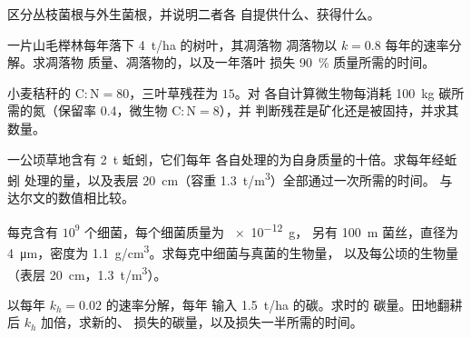 \begin{exercise}[$\star$]\label{exo:b2:living-soil:4}
区分丛枝菌根与外生菌根，并说明二者各
自提供什么、获得什么。
\end{exercise}

\begin{exercise}[$\star\star$]\label{exo:b2:living-soil:5}
一片山毛榉林每年落下 \qty{4}{t/ha} 的树叶，其凋落物
凋落物以 $k = 0.8$ 每年的速率分解。求凋落物
质量、凋落物的，以及一年落叶
损失 \qty{90}{\%} 质量所需的时间。
\end{exercise}

\begin{exercise}[$\star\star$]\label{exo:b2:living-soil:6}
小麦秸秆的 $\mathrm{C:N} = 80$，三叶草残茬为 $15$。对
各自计算微生物每消耗 \qty{100}{kg}
碳所需的氮（保留率 0.4，微生物 $\mathrm{C:N} = 8$），并
判断残茬是矿化还是被固持，并求其数量。
\end{exercise}

\begin{exercise}[$\star\star$]\label{exo:b2:living-soil:7}
一公顷草地含有 \qty{2}{t} 蚯蚓，它们每年
各自处理的为自身质量的十倍。求每年经蚯蚓
处理的量，以及表层
\qty{20}{cm}（容重 \qty{1.3}{t/m^3}）全部通过一次所需的时间。
与达尔文的数值相比较。
\end{exercise}

\begin{exercise}[$\star\star$]\label{exo:b2:living-soil:8}
每克含有 $10^{9}$ 个细菌，每个细菌质量为 \qty{e-12}{g}，
另有 \qty{100}{m} 菌丝，直径为 \qty{4}{\micro m}，密度为
\qty{1.1}{g/cm^3}。求每克中细菌与真菌的生物量，
以及每公顷的生物量（表层 \qty{20}{cm}，\qty{1.3}{t/m^3}）。
\end{exercise}

\begin{exercise}[$\star\star$]\label{exo:b2:living-soil:9}
以每年 $k_h = 0.02$ 的速率分解，每年
输入 \qty{1.5}{t/ha} 的碳。求时的
碳量。田地翻耕后 $k_h$ 加倍，求新的、
损失的碳量，以及损失一半所需的时间。
\end{exercise}

